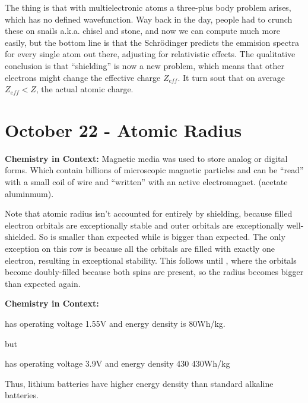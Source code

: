 \documentclass{report}
\begin{document}
The thing is that with multielectronic atoms a three-plus body problem arises, which has no defined wavefunction. Way back in the day, people had to crunch these on snails a.k.a. chisel and stone, and now we can compute much more easily, but the bottom line is that the Schr\"odinger predicts the emmision spectra for every single atom out there, adjusting for relativistic effects. The qualitative conclusion is that ``shielding'' is now a new problem, which means that other electrons might change the effective charge $Z_{eff}$. It turn sout that on average $Z_{eff} < Z$, the actual atomic charge. 

\chapter{October 22 - Atomic Radius}

\begin{center}
\textbf{Chemistry in Context: } Magnetic media was used to store analog or digital forms. Which contain billions of microscopic magnetic particles and can be "`read"' with a small coil of wire and "`written"' with an active electromagnet. (acetate aluminmum).
\end{center}

Note that atomic radius isn't accounted for entirely by shielding, because filled electron orbitals are exceptionally stable and outer orbitals are exceptionally well-shielded. So  is smaller than expected while  is bigger than expected. The only exception on this row is  because all the orbitals are filled with exactly one electron, resulting in exceptional stability. This follows until , where the orbitals become doubly-filled because both spins are present, so the radius becomes bigger than expected again. 

\begin{center}
\textbf{Chemistry in Context: }

 
has operating voltage 1.55V and energy density is 80Wh/kg. 

but


has operating voltage 3.9V and energy density 430 430Wh/kg

Thus, lithium batteries have higher energy density than standard alkaline batteries.
\end{center}
\end{document}
